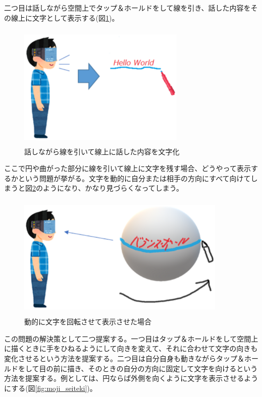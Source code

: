 \documentclass[11pt,a4j, titlepage]{jarticle} %
\begin{document}
二つ目は話しながら空間上でタップ＆ホールドをして線を引き、話した内容をその線上に文字として表示する(図\ref{fig:text_memo2})。

\begin{figure}[H]
  \begin{center}
    \includegraphics[clip,height=6.0cm,width=8.0cm]{./text_memo2.eps}
    \caption{話しながら線を引いて線上に話した内容を文字化}
    \label{fig:text_memo2}
  \end{center}
\end{figure}

ここで円や曲がった部分に線を引いて線上に文字を残す場合、どうやって表示するかという問題が挙がる。文字を動的に自分または相手の方向にすべて向けてしまうと図\ref{fig:moji_douteki}のようになり、かなり見づらくなってしまう。

\begin{figure}[H]
  \begin{center}
    \includegraphics[clip,height=6.0cm,width=10.0cm]{./moji_douteki.eps}
    \caption{動的に文字を回転させて表示させた場合}
    \label{fig:moji_douteki}
  \end{center}
\end{figure}

この問題の解決策として二つ提案する。一つ目はタップ＆ホールドをして空間上に描くときに手をひねるようにして向きを変えて、それに合わせて文字の向きも変化させるという方法を提案する。二つ目は自分自身も動きながらタップ＆ホールドをして目の前に描き、そのときの自分の方向に固定して文字を向けるという方法を提案する。例としては、円ならば外側を向くように文字を表示させるようにする(図\ref{fig:moji_seiteki})。
\end{document}
